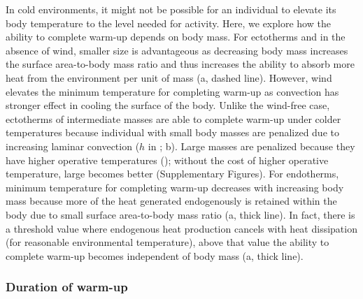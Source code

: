 In cold environments, it might not be possible for an individual to elevate its body temperature to the level needed for activity.
Here, we explore how the ability to complete warm-up depends on body mass.
For ectotherms and in the absence of wind, smaller size is advantageous as decreasing body mass increases the surface area-to-body mass ratio and thus increases the ability to absorb more heat from the environment per unit of mass (a, dashed line).
However, wind elevates the minimum temperature for completing warm-up as convection has stronger effect in cooling the surface of the body.
Unlike the wind-free case, ectotherms of intermediate masses are able to complete warm-up under colder temperatures because individual with small body masses are penalized due to increasing laminar convection ($h$ in ; b).
Large masses are penalized because they have higher operative temperatures (); without the cost of higher operative temperature, large becomes better (Supplementary Figures).
For endotherms, minimum temperature for completing warm-up decreases with increasing body mass because more of the heat generated endogenously is retained within the body due to small surface area-to-body mass ratio (a, thick line).
In fact, there is a threshold value where endogenous heat production cancels with heat dissipation (for reasonable environmental temperature), above that value the ability to complete warm-up becomes independent of body mass (a, thick line).

\subsubsection*{Duration of warm-up}

